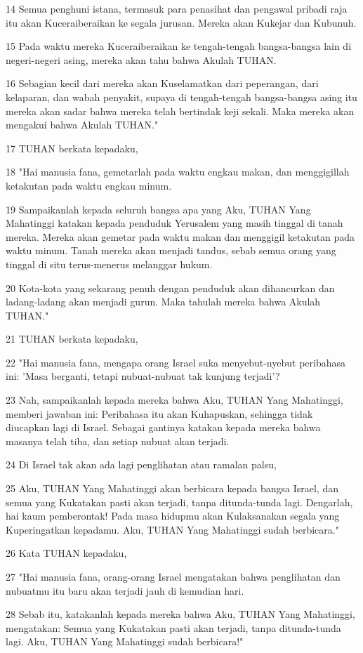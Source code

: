 \par 14 Semua penghuni istana, termasuk para penasihat dan pengawal pribadi raja itu akan Kuceraiberaikan ke segala jurusan. Mereka akan Kukejar dan Kubunuh.
\par 15 Pada waktu mereka Kuceraiberaikan ke tengah-tengah bangsa-bangsa lain di negeri-negeri asing, mereka akan tahu bahwa Akulah TUHAN.
\par 16 Sebagian kecil dari mereka akan Kuselamatkan dari peperangan, dari kelaparan, dan wabah penyakit, supaya di tengah-tengah bangsa-bangsa asing itu mereka akan sadar bahwa mereka telah bertindak keji sekali. Maka mereka akan mengakui bahwa Akulah TUHAN."
\par 17 TUHAN berkata kepadaku,
\par 18 "Hai manusia fana, gemetarlah pada waktu engkau makan, dan menggigillah ketakutan pada waktu engkau minum.
\par 19 Sampaikanlah kepada seluruh bangsa apa yang Aku, TUHAN Yang Mahatinggi katakan kepada penduduk Yerusalem yang masih tinggal di tanah mereka. Mereka akan gemetar pada waktu makan dan menggigil ketakutan pada waktu minum. Tanah mereka akan menjadi tandus, sebab semua orang yang tinggal di situ terus-menerus melanggar hukum.
\par 20 Kota-kota yang sekarang penuh dengan penduduk akan dihancurkan dan ladang-ladang akan menjadi gurun. Maka tahulah mereka bahwa Akulah TUHAN."
\par 21 TUHAN berkata kepadaku,
\par 22 "Hai manusia fana, mengapa orang Israel suka menyebut-nyebut peribahasa ini: 'Masa berganti, tetapi nubuat-nubuat tak kunjung terjadi'?
\par 23 Nah, sampaikanlah kepada mereka bahwa Aku, TUHAN Yang Mahatinggi, memberi jawaban ini: Peribahasa itu akan Kuhapuskan, sehingga tidak diucapkan lagi di Israel. Sebagai gantinya katakan kepada mereka bahwa masanya telah tiba, dan setiap nubuat akan terjadi.
\par 24 Di Israel tak akan ada lagi penglihatan atau ramalan palsu,
\par 25 Aku, TUHAN Yang Mahatinggi akan berbicara kepada bangsa Israel, dan semua yang Kukatakan pasti akan terjadi, tanpa ditunda-tunda lagi. Dengarlah, hai kaum pemberontak! Pada masa hidupmu akan Kulaksanakan segala yang Kuperingatkan kepadamu. Aku, TUHAN Yang Mahatinggi sudah berbicara."
\par 26 Kata TUHAN kepadaku,
\par 27 "Hai manusia fana, orang-orang Israel mengatakan bahwa penglihatan dan nubuatmu itu baru akan terjadi jauh di kemudian hari.
\par 28 Sebab itu, katakanlah kepada mereka bahwa Aku, TUHAN Yang Mahatinggi, mengatakan: Semua yang Kukatakan pasti akan terjadi, tanpa ditunda-tunda lagi. Aku, TUHAN Yang Mahatinggi sudah berbicara!"


